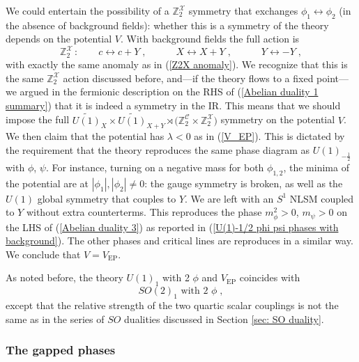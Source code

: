 \documentclass[a4paper, 12pt]{article}
\newcommand{\wt}{\widetilde}
\numberwithin{equation}{section}
\newcommand{\be}{\begin{equation}} \newcommand{\ee}{\end{equation}}
\newcommand{\cC}{\mathcal{C}}
\newcommand{\cX}{\mathcal{X}}
\newcommand{\bZ}{\mathbb{Z}}
\begin{document}
We could entertain the possibility of a $\bZ_2^\cX$ symmetry that exchanges $\phi_1 \leftrightarrow \phi_2$ (in the absence of background fields): whether this is a symmetry of the theory depends on the potential $V$. With background fields the full action is
\be
\bZ_2^\cX\,:\qquad c \leftrightarrow c + Y \;,\qquad\quad X \leftrightarrow X+Y \;,\qquad\quad Y \leftrightarrow -Y \;,
\ee
with exactly the same anomaly as in (\ref{Z2X anomaly}). We recognize that this is the same $\bZ_2^\cX$ action discussed before, and---if the theory flows to a fixed point---we argued in the fermionic description on the RHS of (\ref{Abelian duality 1 summary}) that it is indeed a symmetry in the IR. This means that we should impose the full $\wt{U(1)}_X \times \wt{U(1)}_{X+Y} \rtimes\big( \bZ_2^\cC \times \bZ_2^\cX\big)$ symmetry on the potential $V$. We then claim that the potential has $\lambda<0$ as in (\ref{V_EP}).
This is dictated by the requirement that the theory reproduces the same phase diagram as $U(1)_{-\frac12}$ with $\phi$, $\psi$. For instance, turning on a negative mass for both $\phi_{1,2}$, the minima of the potential are at $|\phi_1|, |\phi_2| \neq 0$: the gauge symmetry is broken, as well as the $U(1)$ global symmetry that couples to $Y$. We are left with an $S^1$ NLSM coupled to $Y$ without extra counterterms. This reproduces the phase $m_\phi^2>0$, $m_\psi>0$ on the LHS of (\ref{Abelian duality 3}) as reported in (\ref{U(1)-1/2 phi psi phases with background}). The other phases and critical lines are reproduces in a similar way. We conclude that $V = V_\text{EP}$.

As noted before, the theory $U(1)_1$ with 2 $\phi$ and $V_\text{EP}$ coincides with
$$
SO(2)_1 \text{ with 2 $\phi$} \;,
$$
except that the relative strength of the two quartic scalar couplings is not the same as in the series of $SO$ dualities discussed in Section \ref{sec: SO duality}.










\subsubsection{The gapped phases}
\label{sec: U(1)-1/2 phi psi phases with background}
\end{document}

